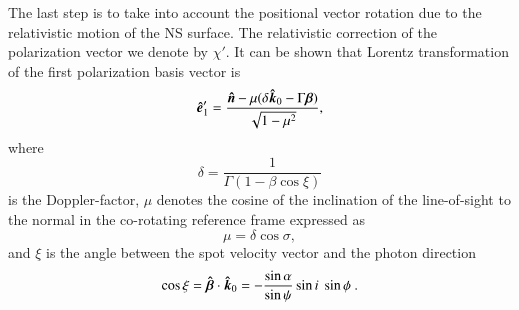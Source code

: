 \documentclass{aa}
\newcommand{\be}{\begin{equation}}
\newcommand{\ee}{\end{equation}}
\newcommand{\unit}[1]{\mbox{\boldmath $\hat{#1}$}}
\newcommand{\red}[1]{\textcolor{red}{#1}}
\newcommand{\blue}[1]{\textcolor{blue}{#1}}
\begin{document}
The last step is to take into account the positional vector rotation due to the relativistic motion of the NS surface. 
The relativistic correction of the polarization vector we denote by $\chi'$. 
It can be shown that Lorentz transformation of the first polarization basis vector is \citep[see e. g.][]{NP93} 
\be\label{eq:primebasis}
\unit{e}_1' = \frac{\unit{n}-\mu (\delta\unit{k}_0-\Gamma\bm{\beta})}{\sqrt{1-\mu^2 } }, %
\ee
where  
\be
	\delta=\frac{1}{\Gamma(1-\beta \cos\xi)} 
\ee
is the Doppler-factor, $\mu$ denotes the cosine of the inclination of the line-of-sight to the normal in the co-rotating reference frame expressed as  \citep{PG03,PB06}
\be
\mu=\delta\cos{\sigma},  %
\ee
and $\xi$ is the angle between the spot velocity vector and the photon direction  
\be \label{eq:cosxi}
\cos\xi = \unit{\beta} \cdot \unit{k}_0 = -  \frac{\sin\alpha}{\sin\psi} \sin i\ \sin\phi\  .
\ee
 

\end{document}
